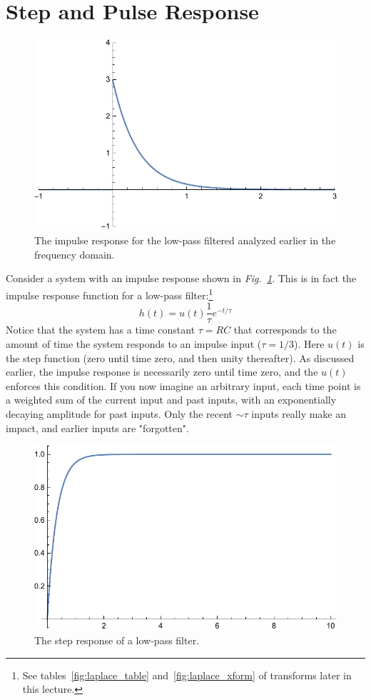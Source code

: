 \section{Step and Pulse Response}
\begin{figure}[tb]
\centering
\includegraphics[width=.6\columnwidth]{impulse_resp}
\caption{The impulse response for the low-pass filtered analyzed earlier in the frequency domain. }
\label{fig:impulse_resp}
\end{figure}
Consider a system with an impulse response shown in \emph{Fig.~\ref{fig:impulse_resp}}.  This is in fact the impulse response function for a low-pass filter:\footnote{See tables~\ref{fig:laplace_table} and~\ref{fig:laplace_xform} of transforms later in this lecture.}
    \begin{equation}
        h(t) = u(t) \frac{1}{\tau} e^{-t/\tau}
    \end{equation}
Notice that the system has a time constant $\tau = RC$ that corresponds to the amount of time the system responds to an impulse input ($\tau = 1/3$).  Here $u(t)$ is the step function (zero until time zero, and then unity thereafter).  As discussed earlier, the impulse response is necessarily zero until time zero, and the $u(t)$ enforces this condition.  If you now imagine an arbitrary input, each time point is a weighted sum of the current input and past inputs, with an exponentially decaying amplitude for past inputs.  Only the recent $\sim \tau$ inputs really make an impact, and earlier inputs are "forgotten".  
\begin{figure}[tb]
\centering
\includegraphics[width=.5\columnwidth]{step_resp}
\caption{The step response of a low-pass filter. }
\label{fig:step_resp}
\end{figure}
